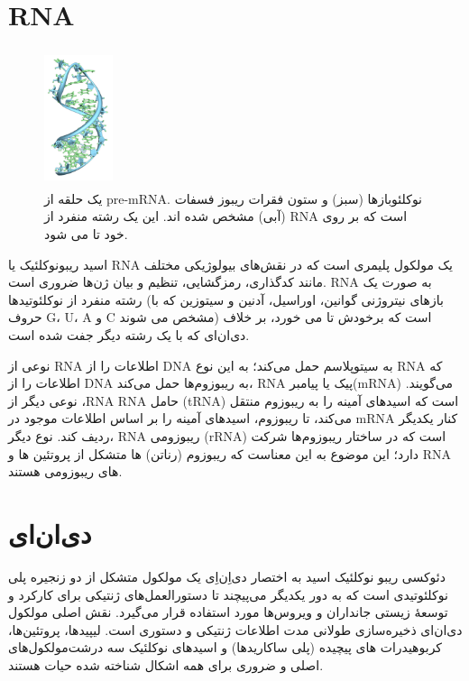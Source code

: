 \documentclass[12pt,a4paper,BCOR=.7cm,headsepline,bibliography=totoc]{report}
\begin{document}
\section{RNA}
\begin{figure}
\centering
\includegraphics[width=2cm, height=4cm]{pictures/Pre-mRNA-1ysv-tubes.png}
\caption{
یک حلقه از pre-mRNA. نوکلئوبازها (سبز) و ستون فقرات ریبوز فسفات (آبی) مشخص شده اند. این یک رشته منفرد از RNA است که بر روی خود تا می شود.
}\label{wrap-fig:1}
\end{figure}
اسید ریبونوکلئیک یا RNA
 یک مولکول پلیمری است که در نقش‌های بیولوژیکی مختلف مانند کدگذاری، رمزگشایی، تنظیم و بیان ژن‌ها ضروری است. RNA به صورت یک رشته منفرد از نوکلئوتیدها (بازهای نیتروژنی گوانین، اوراسیل، آدنین و سیتوزین که با حروف G، U، A و C مشخص می شوند) است که برخودش تا می خورد، بر خلاف دی‌ان‌ای که با یک رشته دیگر جفت شده است.
 
نوعی از RNA اطلاعات را از DNA به سیتوپلاسم حمل می‌کند؛ به این نوع RNA که اطلاعات را از DNA به ریبوزوم‌ها حمل می‌کند، RNA پیک یا پیامبر(mRNA) می‌گویند. نوعی دیگر از ،RNA
RNA
 حامل (tRNA) است که اسیدهای آمینه را به ریبوزوم منتقل می‌کند، تا ریبوزوم، اسیدهای آمینه را بر اساس اطلاعات موجود در mRNA کنار یکدیگر ردیف کند. نوع دیگر، RNA ریبوزومی (rRNA) است که در ساختار ریبوزوم‌ها شرکت دارد؛ این موضوع به این معناست که ریبوزوم (رناتن) ها متشکل از پروتئین ها و RNA های ریبوزومی هستند.
\section{دی‌ان‌ای}

دئوکسی ریبو نوکلئیک اسید به اختصار دی‌اِن‌اِی یک مولکول متشکل از دو زنجیره پلی نوکلئوتیدی است که به دور یکدیگر می‌پیچند تا دستورالعمل‌های ژنتیکی برای کارکرد و توسعهٔ زیستی جانداران و ویروس‌ها مورد استفاده قرار می‌گیرد. نقش اصلی مولکول دی‌ان‌ای ذخیره‌سازی طولانی مدت اطلاعات ژنتیکی و دستوری است. لیپید‌ها، پروتئین‌ها، کربوهیدرات های پیچیده (پلی ساکاریدها) و اسیدهای نوکلئیک سه درشت‌مولکول‌های اصلی و ضروری برای همه اشکال شناخته شده حیات هستند.
\end{document}
